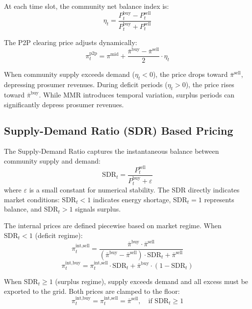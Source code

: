 \documentclass[pdflatex,sn-mathphys-num]{sn-jnl}
\theoremstyle{thmstyleone}
\theoremstyle{thmstyletwo}
\begin{document}
At each time slot, the community net balance index is:
\begin{equation}
    \eta_t = \frac{P_t^{\text{buy}} - P_t^{\text{sell}}}{P_t^{\text{buy}} + P_t^{\text{sell}}}
    \label{eq:mmr_balance}
\end{equation}

The P2P clearing price adjusts dynamically:
\begin{equation}
    \pi_t^{\text{p2p}} = \pi^{\text{mid}} + \frac{\bar{\pi}^{\text{buy}} - \bar{\pi}^{\text{sell}}}{2} \cdot \eta_t
    \label{eq:mmr_price}
\end{equation}

When community supply exceeds demand ($\eta_t < 0$), the price drops toward $\bar{\pi}^{\text{sell}}$, depressing prosumer revenues. During deficit periods ($\eta_t > 0$), the price rises toward $\bar{\pi}^{\text{buy}}$. While MMR introduces temporal variation, surplus periods can significantly depress prosumer revenues.

\subsection{Supply-Demand Ratio (SDR) Based Pricing}

The Supply-Demand Ratio captures the instantaneous balance between community supply and demand:
\begin{equation}
    \text{SDR}_t = \frac{P_t^{\text{sell}}}{P_t^{\text{buy}} + \varepsilon}
    \label{eq:sdr}
\end{equation}
where $\varepsilon$ is a small constant for numerical stability. The SDR directly indicates market conditions: $\text{SDR}_t < 1$ indicates energy shortage, $\text{SDR}_t = 1$ represents balance, and $\text{SDR}_t > 1$ signals surplus.

The internal prices are defined piecewise based on market regime. When $\text{SDR}_t < 1$ (deficit regime):
\begin{equation}
    \pi_t^{\text{int,sell}} = \frac{\bar{\pi}^{\text{buy}} \cdot \bar{\pi}^{\text{sell}}}{(\bar{\pi}^{\text{buy}} - \bar{\pi}^{\text{sell}}) \cdot \text{SDR}_t + \bar{\pi}^{\text{sell}}}
    \label{eq:sdr_sell}
\end{equation}
\begin{equation}
    \pi_t^{\text{int,buy}} = \pi_t^{\text{int,sell}} \cdot \text{SDR}_t + \bar{\pi}^{\text{buy}} \cdot (1 - \text{SDR}_t)
    \label{eq:sdr_buy}
\end{equation}

When $\text{SDR}_t \geq 1$ (surplus regime), supply exceeds demand and all excess must be exported to the grid. Both prices are clamped to the floor:
\begin{equation}
    \pi_t^{\text{int,buy}} = \pi_t^{\text{int,sell}} = \bar{\pi}^{\text{sell}}, \quad \text{if } \text{SDR}_t \geq 1
    \label{eq:sdr_clamp}
\end{equation}
\end{document}
